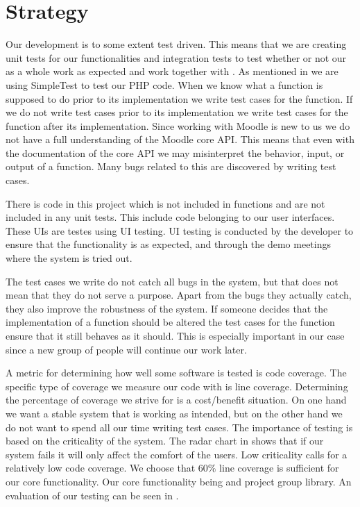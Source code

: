 \section{Strategy}
\label{sec:strategy}
\newcommand{\idealCC}{\todo{gerne en kilde p\aa{} at det er et godt tal}$60\%$}
Our development is to some extent test driven.
This means that we are creating unit tests for our functionalities and integration tests to test whether or not our \subsystem{} as a whole work as expected and work together with \moodle{}.
As mentioned in  we are using SimpleTest to test our PHP code.
When we know what a function is supposed to do prior to its implementation we write test cases for the function.
If we do not write test cases prior to its implementation we write test cases for the function after its implementation. 
Since working with Moodle is new to us we do not have a full understanding of the Moodle core API.
This means that even with the documentation of the \moodle{} core API we may misinterpret the behavior, input, or output of a function.
Many bugs related to this are discovered by writing test cases.

There is code in this project which is not included in functions and are not included in any unit tests.
This include code belonging to our user interfaces.
These UIs are testes using UI testing. 
UI testing is conducted by the developer to ensure that the functionality is as expected, and through the demo meetings where the system is tried out. 

The test cases we write do not catch all bugs in the system, but that does not mean that they do not serve a purpose.
Apart from the bugs they actually catch, they also improve the robustness of the system.
If someone decides that the implementation of a function should be altered the test cases for the function ensure that it still behaves as it should.
This is especially important in our case since a new group of people will continue our work later.

A metric for determining how well some software is tested is code coverage. 
The specific type of coverage we measure our code with is line coverage. 
Determining the percentage of coverage we strive for is a cost/benefit situation.
On one hand we want a stable system that is working as intended, but on the other hand we do not want to spend all our time writing test cases.
The importance of testing is based on the criticality of the system.
The radar chart in  shows that if our system fails it will only affect the comfort of the users.
Low criticality calls for a relatively low code coverage.
We choose that \idealCC{} line coverage is sufficient for our core functionality.
Our core functionality being \admlib{} and project group library.
An evaluation of our testing can be seen in .

